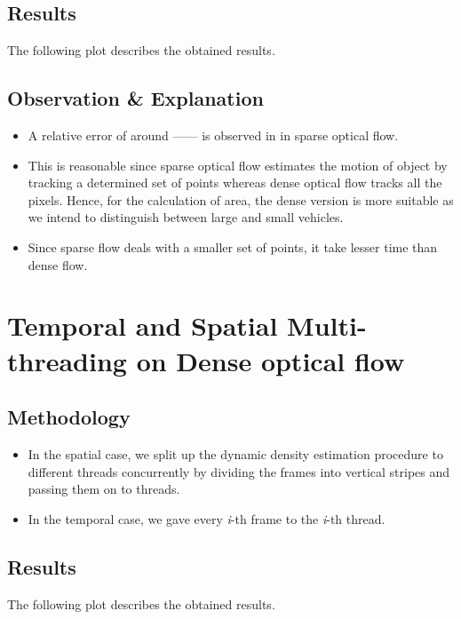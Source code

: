\documentclass[a4paper]{article}
\begin{document}
\subsection*{Results}
The following plot describes the obtained results.
\subsection*{Observation \& Explanation}
\begin{itemize}
    \item A relative error of around ------ is observed in in sparse optical flow. 
    \item  This is reasonable since sparse optical flow estimates the motion of object by tracking a determined set of points whereas dense optical flow tracks all the pixels. Hence, for the calculation of area, the dense version is more suitable as we intend to distinguish between large and small vehicles.
    \item Since sparse flow deals with a smaller set of points, it take lesser time than dense flow.
\end{itemize}
\section*{Temporal and Spatial Multi-threading on Dense optical flow}
\subsection*{Methodology}
\begin{itemize}
    \item In the spatial case, we split up the dynamic density estimation procedure to different threads concurrently by dividing the frames into vertical stripes and passing them on to threads.
    \item In the temporal case, we gave every \textit{i}-th frame to the \textit{i}-th thread. 
    
\end{itemize}
\subsection*{Results}
The following plot describes the obtained results.
\end{document}
